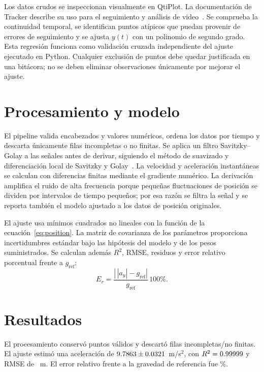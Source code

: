 \documentclass[conference]{IEEEtran}
\begin{document}
Los datos crudos se inspeccionan visualmente en QtiPlot. La documentación de Tracker describe su uso para el seguimiento y análisis de video~\cite{tracker}. Se comprueba la continuidad temporal, se identifican puntos atípicos que puedan provenir de errores de seguimiento y se ajusta $y(t)$ con un polinomio de segundo grado. Esta regresión funciona como validación cruzada independiente del ajuste ejecutado en Python. Cualquier exclusión de puntos debe quedar justificada en una bitácora; no se deben eliminar observaciones únicamente por mejorar el ajuste.

\section{Procesamiento y modelo}
El pipeline valida encabezados y valores numéricos, ordena los datos por tiempo y descarta únicamente filas incompletas o no finitas. Se aplica un filtro Savitzky--Golay a las señales antes de derivar, siguiendo el método de suavizado y diferenciación local de Savitzky y Golay~\cite{savitzky}. La velocidad y aceleración instantáneas se calculan con diferencias finitas mediante el gradiente numérico. La derivación amplifica el ruido de alta frecuencia porque pequeñas fluctuaciones de posición se dividen por intervalos de tiempo pequeños; por esa razón se filtra la señal y se reporta también el modelo ajustado a los datos de posición originales.

El ajuste usa mínimos cuadrados no lineales con la función de la ecuación~\eqref{eq:position}. La matriz de covarianza de los parámetros proporciona incertidumbres estándar bajo las hipótesis del modelo y de los pesos suministrados. Se calculan además $R^2$, RMSE, residuos y error relativo porcentual frente a $g_{\mathrm{ref}}$:
\begin{equation}
 E_r=\frac{\left|\,|a_y|-g_{\mathrm{ref}}\right|}{g_{\mathrm{ref}}}\,100\%.
\end{equation}

\section{Resultados}
El procesamiento conservó \ValidDataPoints{} puntos válidos y descartó \DroppedDataPoints{} filas incompletas/no finitas. El ajuste estimó una aceleración de $9.7863\pm0.0321$~m/s$^2$, con $R^2=0.99999$ y RMSE de \FitRMSE{}~m. El error relativo frente a la gravedad de referencia fue \GravityRelativeError\%.
\end{document}
